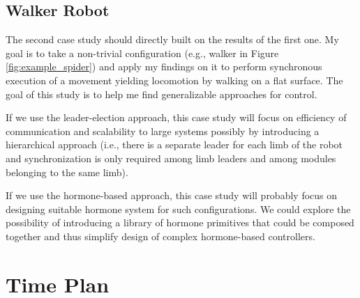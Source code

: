 \subsection{Walker Robot}

The second case study should directly built on the results of the first one. My
goal is to take a non-trivial configuration (e.g., walker in Figure
\ref{fig:example_spider}) and apply my findings on it to perform synchronous
execution of a movement yielding locomotion by walking on a flat surface. The
goal of this study is to help me find generalizable approaches for control.

If we use the leader-election approach, this case study will focus on efficiency
of communication and scalability to large systems possibly by introducing a
hierarchical approach (i.e., there is a separate leader for each limb of the
robot and synchronization is only required among limb leaders and among modules
belonging to the same limb).

If we use the hormone-based approach, this case study will probably focus on
designing suitable hormone system for such configurations. We could explore the
possibility of introducing a library of hormone primitives that could be
composed together and thus simplify design of complex hormone-based controllers.

\section{Time Plan}

